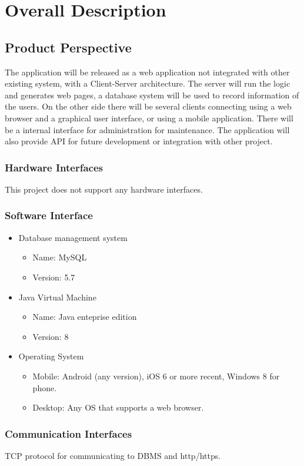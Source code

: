 \section{Overall Description}

\subsection{Product Perspective}
	The application will be released as a web application not integrated with other existing system, with a Client-Server architecture. The server will run the logic and generates web pages, a database system will be used to record information of the users. On the other side there will be several clients connecting using a web browser and a graphical user interface, or using a mobile application.
	There will be a internal interface for administration for maintenance. 
	The application will also provide API for future development or integration with other project.
\subsubsection{Hardware Interfaces}
	This project does not support any hardware interfaces.
\subsubsection{Software Interface}
	\begin{itemize}
		\item {Database management system}
			\begin{itemize}
				\item Name: MySQL
				\item Version: 5.7
			\end{itemize}
		\item {Java Virtual Machine}
			\begin{itemize}
				\item Name: Java enteprise edition
				\item Version: 8
			\end{itemize}
		\item {Operating System}
			\begin{itemize}
				\item Mobile: Android (any version), iOS 6 or more recent, Windows 8 for phone.
				\item Desktop: Any OS that supports a web browser.
			\end{itemize}
	\end{itemize}
\subsubsection{Communication Interfaces}
	TCP protocol for communicating to DBMS and http/https.			
